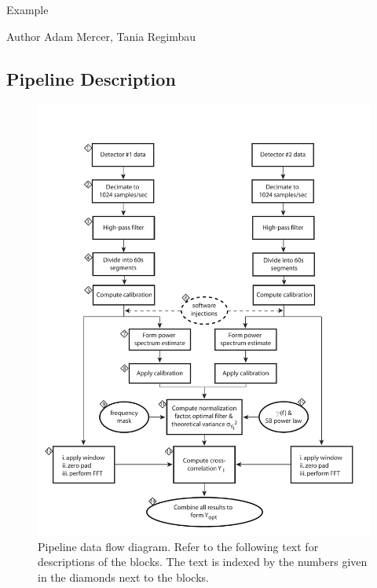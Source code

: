 \begin{entry}
\item[Example]

\item[Author] 
Adam Mercer, Tania Regimbau
\end{entry}
\clearpage

\subsection{Pipeline Description}

\begin{figure}[htbp]
\begin{center}
\includegraphics[width=5.5in]{figures/stochastic_flowdiagram.pdf}
\caption{Pipeline data flow diagram. Refer to the following text
	for descriptions of the blocks. The text is indexed by the numbers
  given in the diamonds next to the blocks.}
\label{fig:blockdigram}
\end{center}
\end{figure}

